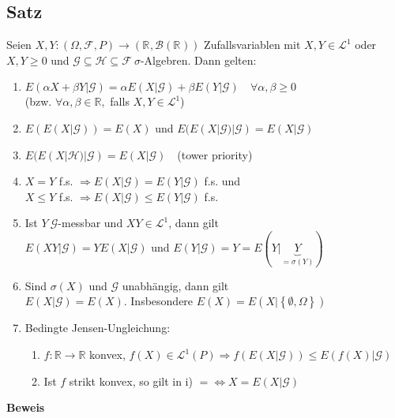 \documentclass[german,10pt,oneside, fleqn, a4paper]{article}
\newcommand {\R}	{\mathbb{R}}
\newcommand{\Ra}	{\Rightarrow}
\newcommand{\LRa}{\Leftrightarrow}
\newcommand{\ra}{\rightarrow}
\newcommand{\brc}[1]{\left(#1\right)}
\newcommand{\brac}[1]{\left\lbrace #1\right\rbrace}
\newcommand{\mc}[1]{\mathcal{#1}}
\newcommand{\lp}[1]{\mc{L}^{#1}}
\newcommand{\beweis}{\textbf{Beweis}\\}
\newcommand{\1}[1]{1_{#1}}
\newcommand{\2}[1]{\1{\brac{#1}}}
\newcommand{\rbor}[1][d]{\brc{\R^{#1},\mc{B}\brc{\R^{#1}}}}
\newcommand{\raum}{\brc{\Omega,\mc{F},P}}
\newcommand{\g}{\mc{G}}
\newcommand{\f}{\mc{F}}
\begin{document}
\subsection{Satz}
\label{6.2}
Seien $X,Y:\raum\ra\rbor[]$ Zufallsvariablen mit $X,Y\in\lp{1}$ oder $X,Y\geq 0$ und $\g\subseteq\mc{H}\subseteq\f\ \sigma$-Algebren. Dann gelten:\begin{enumerate}[label=(\alph*)]
\item $E(\alpha X+\beta Y|\g)=\alpha E(X|\g)+\beta E(Y|\g)\quad\forall\alpha,\beta\geq0$\\
(bzw. $\forall\alpha,\beta\in\R,$ falls $X,Y\in\lp{1}$)
\item $E(E(X|\g))=E(X)$ und $E(E(X|\g)|\g)=E(X|\g)$
\item $E(E(X|\mc{H})|\g)=E(X|\g)$\ \ (tower priority)
\item $X=Y$ f.s. $\Ra E(X|\g)=E(Y|\g)$ f.s. und\\
 $X\leq Y$ f.s. $\Ra E(X|\g)\leq E(Y|\g)$ f.s.
\item Ist $Y\ \g$-messbar und $XY\in\lp{1}$, dann gilt \\
$E(XY|\g)=YE(X|\g)$ und $E(Y|\g)=Y=E(Y|\underbrace{Y}_{=\sigma(Y)})$
\item Sind $\sigma(X)$ und $\g$ unabhängig, dann gilt \\
$E(X|\g)=E(X)$. Insbesondere $E(X)=E(X|\brac{\emptyset,\Omega})$
\item Bedingte Jensen-Ungleichung:
\begin{enumerate}[label=(\roman*)]
	\item $f:\R\ra\R$ konvex, $f(X)\in\lp{1}(P)\Ra f(E(X|\g))\leq E(f(X)|\g)$
	\item Ist $f$ strikt konvex, so gilt in i) \grqq$=$\grqq$\LRa X=E(X|\g)$
\end{enumerate}
\end{enumerate}
\beweis
\end{document}
